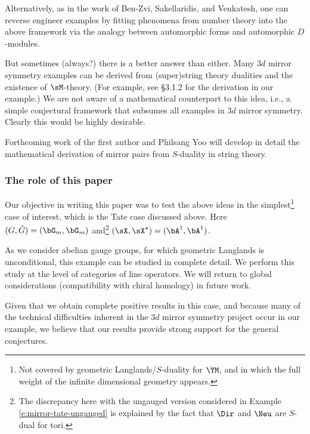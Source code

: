 Alternatively, as in the work of Ben-Zvi, Sakellaridis, and Venkatesh,
one can reverse engineer examples by fitting phenomena from number theory
into the above framework via the analogy between automorphic forms
and automorphic $D$-modules.

But sometimes (always?) there is a better answer than either.
Many $3d$ mirror symmetry examples can be derived from (super)string
theory dualities and the existence of $\sM$-theory. (For example, see
\cite{gaiotto-witten} \S 3.1.2 for the derivation in our example.)
We are not aware of a mathematical counterpart to this idea, i.e., a simple conjectural
framework that subsumes all examples in $3d$ mirror symmetry. Clearly this
would be highly desirable.

\begin{rem}
\notready

Forthcoming work of the first author and Philsang Yoo will develop in detail the
mathematical derivation of mirror pairs from $S$-duality in string theory.

\end{rem}

\subsubsection{The role of this paper}

Our objective in writing this paper was to test the above ideas in the
simplest\footnote{Not covered by geometric Langlands/$S$-duality for $\YM$,
and in which the full weight of the infinite dimensional geometry appears.}
case of interest, which is the Tate case discussed above.
Here $(G,\check{G}) = (\bG_m,\bG_m)$ and\footnote{The discrepancy here with the
ungauged version considered in Example \ref{e:mirror-tate-ungauged} is
explained by the fact that $\Dir$ and $\Neu$ are $S$-dual for tori.}
$(\sX,\sX^{\star}) = (\bA^1,\bA^1)$.

As we consider abelian gauge groups,
for which geometric Langlands is unconditional, this example can be
studied in complete detail.
We perform this study at the level of categories of line operators. We will
return to global considerations (compatibility with chiral homology) in
future work.

Given that we obtain complete positive results in this case, and
because many of the technical difficulties inherent in the $3d$ mirror symmetry
project occur in our example, we believe that our results provide strong
support for the general conjectures.


